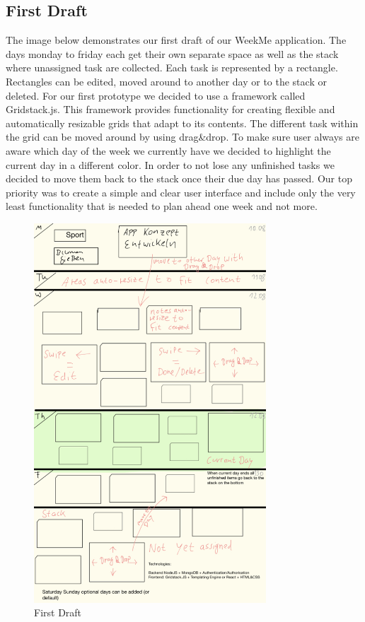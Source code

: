\cleardoublepage 

\subsection{First Draft}  
	
The image below demonstrates our first draft of our WeekMe application. The days monday to friday each get their own separate space as well as the stack where unassigned task are collected. Each task is represented by a rectangle. Rectangles can be edited, moved around to another day or to the stack or deleted. For our first prototype we decided to use a framework called Gridstack.js. This framework provides functionality for creating flexible and automatically resizable grids that adapt to its contents. The different task within the grid can be moved around by using drag\&drop. To make sure user always are aware which day of the week we currently have we decided to highlight the current day in a different color. In order to not lose any unfinished tasks we decided to move them back to the stack once their due day has passed. Our top priority was to create a simple and clear user interface and include only the very least functionality that is needed to plan ahead one week and not more.   
 
 	\begin{figure}[H] 
		\centering 
		\includegraphics[height=14.2cm]{figures/firstdraft}    
		\caption{First Draft}     
	\end{figure}  


